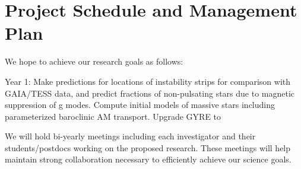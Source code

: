 \section{Project Schedule and Management Plan}

We hope to achieve our research goals as follows:

Year 1: Make predictions for locations of instability strips for comparison with GAIA/TESS data, and predict fractions of non-pulsating stars due to magnetic suppression of g modes. Compute initial models of massive stars including parameterized baroclinic AM transport.  Upgrade GYRE to 

We will  hold bi-yearly meetings including each investigator and their students/postdocs working on the proposed research. These meetings will help maintain strong collaboration necessary to efficiently achieve our science goals.
